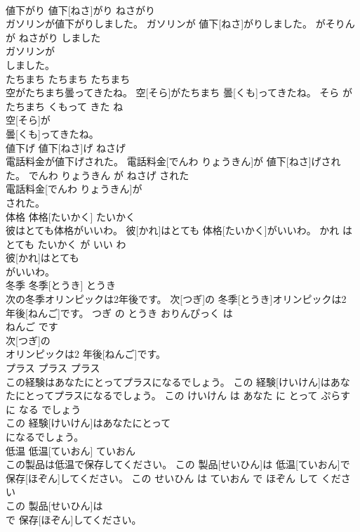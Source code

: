 \documentclass[8pt]{extreport}
\begin{document}
\begin{CJK}{UTF8}{min}
\\	値下がり	値下[ねさ]がり	ねさがり	
\\	ガソリンが値下がりしました。	ガソリンが 値下[ねさ]がりしました。	がそりん が ねさがり しました	
\\	ガソリンが
\\	しました。			
\\	たちまち	たちまち	たちまち	
\\	空がたちまち曇ってきたね。	空[そら]がたちまち 曇[くも]ってきたね。	そら が たちまち くもって きた ね	
\\	空[そら]が
\\	曇[くも]ってきたね。			
\\	値下げ	値下[ねさ]げ	ねさげ	
\\	電話料金が値下げされた。	電話料金[でんわ りょうきん]が 値下[ねさ]げされた。	でんわ りょうきん が ねさげ された	
\\	電話料金[でんわ りょうきん]が
\\	された。			
\\	体格	体格[たいかく]	たいかく	
\\	彼はとても体格がいいわ。	彼[かれ]はとても 体格[たいかく]がいいわ。	かれ は とても たいかく が いい わ	
\\	彼[かれ]はとても
\\	がいいわ。			
\\	冬季	冬季[とうき]	とうき	
\\	次の冬季オリンピックは2年後です。	次[つぎ]の 冬季[とうき]オリンピックは2 年後[ねんご]です。	つぎ の とうき おりんぴっく は 
\\	ねんご です	
\\	次[つぎ]の
\\	オリンピックは2 年後[ねんご]です。			
\\	プラス	プラス	プラス	
\\	この経験はあなたにとってプラスになるでしょう。	この 経験[けいけん]はあなたにとってプラスになるでしょう。	この けいけん は あなた に とって ぷらす に なる でしょう	
\\	この 経験[けいけん]はあなたにとって
\\	になるでしょう。			
\\	低温	低温[ていおん]	ていおん	
\\	この製品は低温で保存してください。	この 製品[せいひん]は 低温[ていおん]で 保存[ほぞん]してください。	この せいひん は ていおん で ほぞん して ください	
\\	この 製品[せいひん]は
\\	で 保存[ほぞん]してください。			

\end{CJK}
\end{document}
